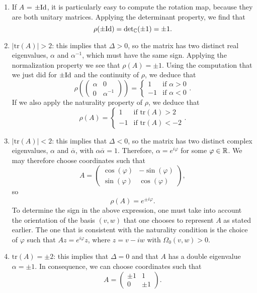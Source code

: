 \begin{enumerate}
	\item If $A$ = $\pm \text{Id}$, it is particularly easy to compute the rotation map, because they are both unitary matrices. Applying the determinant property, we find that
	\[\rho(\pm \text{Id}) = \text{det}_{\mathbb{C}}(\pm 1) = \pm 1 .\]
	\item $|\text{tr}(A)| > 2$: this implies that $\Delta > 0$, so the matrix has two distinct real eigenvalues, $\alpha$ and $\alpha^{-1}$, which must have the same sign. Applying the normalization property we see that $\rho(A) = \pm 1$. Using the computation that we just did for $\pm \text{Id}$ and the continuity of $\rho$, we deduce that
	\[\rho\left(\begin{pmatrix}\alpha & 0 \\ 0 & \alpha^{-1}\end{pmatrix}\right) = \left\{ \begin{array}{lc} 1 & \text{if } \alpha > 0 \\ -1 & \text{if } \alpha < 0 \end{array} \right. .\]
	If we also apply the naturality property of $\rho$, we deduce that
	\[\rho(A) = \left\{ \begin{array}{lc} 1 & \text{if tr}(A) > 2 \\ -1 & \text{if tr}(A) < -2 \end{array} \right. .\]
	\item $|\text{tr}(A)| < 2$: this implies that $\Delta < 0$, so the matrix has two distinct complex eigenvalues, $\alpha$ and $\overline{\alpha}$, with $\alpha\overline{\alpha} = 1$. Therefore, $\alpha = e^{i \varphi}$ for some $\varphi \in \mathbb{R}$. We may therefore choose coordinates such that
	\[A = \begin{pmatrix} \cos(\varphi) & -\sin(\varphi) \\ \sin(\varphi) & \cos(\varphi) \end{pmatrix} ,\]
	so
	\[\rho(A) = e^{\pm i \varphi} .\]
	To determine the sign in the above expression, one must take into account the orientation of the basis $(v,w)$ that one chooses to represent $A$ as stated earlier. The one that is consistent with the naturality condition is the choice of $\varphi$ such that $Az = e^{i \varphi} z$, where $z = v - iw$ with $\Omega_0(v,w) > 0$.
	\item $\text{tr}(A) = \pm 2$: this implies that $\Delta = 0$ and that $A$ has a double eigenvalue $\alpha = \pm 1$. In consequence, we can choose coordinates such that
	\[A = \begin{pmatrix} \pm 1 & 1 \\ 0 & \pm 1 \end{pmatrix} .\]

\end{enumerate}
